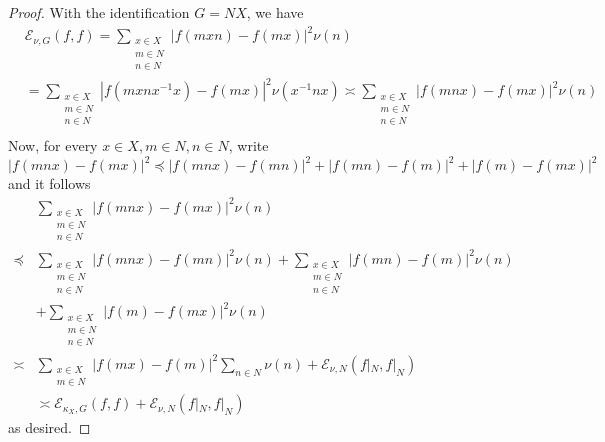 \documentclass[pdflatex,sn-mathphys-num]{sn-jnl}%
\theoremstyle{thmstyleone}%
\theoremstyle{thmstyletwo}%
\theoremstyle{thmstylethree}%
\begin{document}
\begin{proof}
With the identification $G = NX$, we have
\begin{align*}
     & \mathcal{E}_{\nu, G} (f,f) 
     = \sum_{\substack{x\in X\\ m\in N\\n\in N}} |f(mxn) - f(mx)|^2 \nu(n)\\
      & = \sum_{\substack{x\in X\\ m\in N\\n\in N}} |f(mxnx^{-1}x) - f(mx)|^2 \nu(x^{-1}nx)  \asymp \sum_{\substack{x\in X\\ m\in N\\n\in N}} |f(mnx) - f(mx)|^2 \nu(n) \\
\end{align*}
Now, for every $x \in X, m \in N, n\in N$, write 
$$|f(mnx) - f(mx)|^2 \preccurlyeq |f(mnx) -f(mn)|^2 + |f(mn) - f(m)|^2 + |f(m) - f(mx)|^2$$
and it follows 
\begin{align*}
    &  \sum_{\substack{x\in X\\ m\in N\\n\in N}} |f(mnx) - f(mx)|^2 \nu(n)  \\
    \preccurlyeq &   \sum_{\substack{x\in X\\ m\in N\\n\in N}} |f(mnx) - f(mn)|^2 \nu(n) +  \sum_{\substack{x\in X\\ m\in N\\n\in N}} |f(mn) - f(m)|^2 \nu(n) \\
     & + 
    \sum_{\substack{x\in X\\ m\in N\\n\in N}} |f(m) - f(mx)|^2 \nu(n)  \\
   \asymp  &   \sum_{\substack{x\in X\\ m\in N}} |f(mx) - f(m)|^2 \sum_{n \in N} \nu(n) + \mathcal{E}_{\nu, N}(f|_N, f|_N) 
   \\
    & \asymp \mathcal{E}_{\kappa_X, G}(f,f) + \mathcal{E}_{\nu, N}(f|_N, f|_N)  
\end{align*}
as desired. 
\end{proof}
\end{document}
